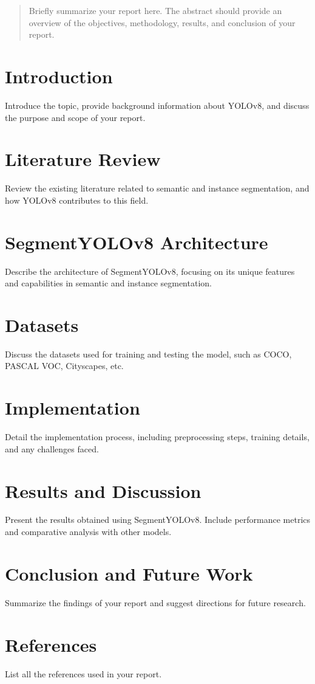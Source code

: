 \documentclass[a4paper]{article}
\begin{document}

\newpage
\tableofcontents
\newpage
\begin{abstract}
	Briefly summarize your report here. The abstract should provide an overview of the objectives, methodology, results, and conclusion of your report.
\end{abstract}

\section{Introduction}
Introduce the topic, provide background information about YOLOv8, and discuss the purpose and scope of your report.

\section{Literature Review}
Review the existing literature related to semantic and instance segmentation, and how YOLOv8 contributes to this field.

\section{SegmentYOLOv8 Architecture}
Describe the architecture of SegmentYOLOv8, focusing on its unique features and capabilities in semantic and instance segmentation.

\section{Datasets}
Discuss the datasets used for training and testing the model, such as COCO, PASCAL VOC, Cityscapes, etc.

\section{Implementation}
Detail the implementation process, including preprocessing steps, training details, and any challenges faced.

\section{Results and Discussion}
Present the results obtained using SegmentYOLOv8. Include performance metrics and comparative analysis with other models.

\section{Conclusion and Future Work}
Summarize the findings of your report and suggest directions for future research.

\section{References}
List all the references used in your report.
\end{document}
